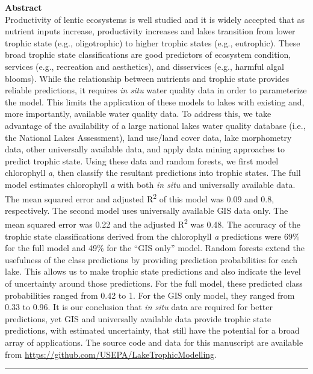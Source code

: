 \documentclass[12pt,]{article}
\begin{document}
\textbf{Abstract}\\Productivity of lentic ecosystems is well studied and
it is widely accepted that as nutrient inputs increase, productivity
increases and lakes transition from lower trophic state (e.g.,
oligotrophic) to higher trophic states (e.g., eutrophic). These broad
trophic state classifications are good predictors of ecosystem
condition, services (e.g., recreation and aesthetics), and disservices
(e.g., harmful algal blooms). While the relationship between nutrients
and trophic state provides reliable predictions, it requires \emph{in
situ} water quality data in order to parameterize the model. This limits
the application of these models to lakes with existing and, more
importantly, available water quality data. To address this, we take
advantage of the availability of a large national lakes water quality
database (i.e., the National Lakes Assessment), land use/land cover
data, lake morphometry data, other universally available data, and apply
data mining approaches to predict trophic state. Using these data and
random forests, we first model chlorophyll \emph{a}, then classify the
resultant predictions into trophic states. The full model estimates
chlorophyll \emph{a} with both \emph{in situ} and universally available
data. The mean squared error and adjusted R\textsuperscript{2} of this
model was 0.09 and 0.8, respectively. The second model uses universally
available GIS data only. The mean squared error was 0.22 and the
adjusted R\textsuperscript{2} was 0.48. The accuracy of the trophic
state classifications derived from the chlorophyll \emph{a} predictions
were 69\% for the full model and 49\% for the ``GIS only'' model. Random
forests extend the usefulness of the class predictions by providing
prediction probabilities for each lake. This allows us to make trophic
state predictions and also indicate the level of uncertainty around
those predictions. For the full model, these predicted class
probabilities ranged from 0.42 to 1. For the GIS only model, they ranged
from 0.33 to 0.96. It is our conclusion that \emph{in situ} data are
required for better predictions, yet GIS and universally available data
provide trophic state predictions, with estimated uncertainty, that
still have the potential for a broad array of applications. The source
code and data for this manuscript are available from
\url{https://github.com/USEPA/LakeTrophicModelling}.

\vspace{3mm}

\hrule
\end{document}
